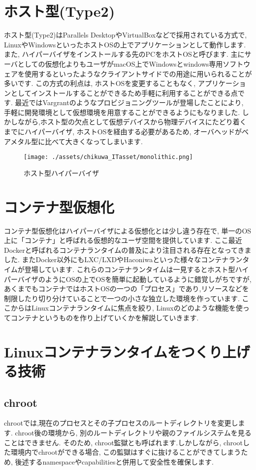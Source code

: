 \section{ホスト型(Type2)}
ホスト型(Type2)はParallels DesktopやVirtualBoxなどで採用されている方式で, LinuxやWindowsといったホストOSの上でアプリケーションとして動作します. また, ハイパーバイザをインストールする先のPCをホストOSと呼びます. 主にサーバとしての仮想化よりもユーザがmacOS上でWindowsとwindows専用ソフトウェアを使用するといったようなクライアントサイドでの用途に用いられることが多いです. この方式の利点は, ホストOSを変更することもなく, アプリケーションとしてインストールすることができるため手軽に利用することができる点です. 最近ではVargrantのようなプロビジョニングツールが登場したことにより, 手軽に開発環境として仮想環境を用意することができるようにもなりました. しかしながら,ホスト型の欠点として仮想デバイスから物理デバイスにたどり着くまでにハイパーバイザ, ホストOSを経由する必要があるため, オーバヘッドがベアメタル型に比べて大きくなってしまいます.
\begin{figure}[htbp]
    \centering
    \texttt{[image: ./assets/chikuwa\_ITasset/monolithic.png]}
    \caption{ホスト型ハイパーバイザ}
    \label{fig:hosthypervisor}
\end{figure}
\section{コンテナ型仮想化}
コンテナ型仮想化はハイパーバイザによる仮想化とは少し違う存在で, 単一のOS上に「コンテナ」と呼ばれる仮想的なユーザ空間を提供しています. ここ最近Dockerと呼ばれるコンテナランタイムの普及により注目される存在となってきました. またDocker以外にもLXC/LXDやHaconiwaといった様々なコンテナランタイムが登場しています. これらのコンテナランタイムは一見するとホスト型ハイパーバイザのようにOSの上でOSを簡単に起動しているように錯覚しがちですが, あくまでもコンテナではホストOSの一つの「プロセス」であり,リソースなどを制限したり切り分けていることで一つの小さな独立した環境を作っています. ここからはLinuxコンテナランタイムに焦点を絞り, Linuxのどのような機能を使ってコンテナというものを作り上げていくかを解説していきます.
\section{Linuxコンテナランタイムをつくり上げる技術}
\subsection{chroot}
chrootでは,現在のプロセスとその子プロセスのルートディレクトリを変更します. chroot後の環境から, 別のルートディレクトリや親のファイルシステムを見ることはできません. そのため, chroot監獄とも呼ばれます.しかしながら, chrootした環境内でchrootができる場合, この監獄はすぐに抜けることができてしまうため, 後述するnamespaceやcapabilitiesと併用して安全性を確保します.
